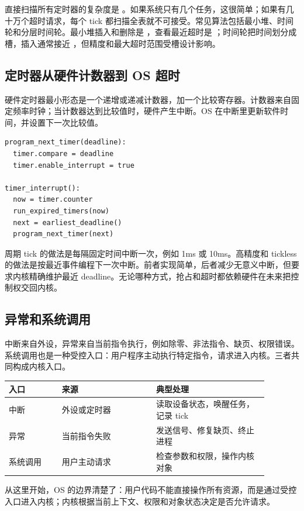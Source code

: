 直接扫描所有定时器的复杂度是 。如果系统只有几个任务，这很简单；如果有几十万个超时请求，每个 tick 都扫描全表就不可接受。常见算法包括最小堆、时间轮和分层时间轮。最小堆插入和删除是 ，查看最近超时是 ；时间轮把时间划分成槽，插入通常接近 ，但精度和最大超时范围受槽设计影响。

\subsection{定时器从硬件计数器到 OS 超时}

硬件定时器最小形态是一个递增或递减计数器，加一个比较寄存器。计数器来自固定频率时钟；当计数器达到比较值时，硬件产生中断。OS 在中断里更新软件时间，并设置下一次比较值。

\begin{lstlisting}
program_next_timer(deadline):
  timer.compare = deadline
  timer.enable_interrupt = true

timer_interrupt():
  now = timer.counter
  run_expired_timers(now)
  next = earliest_deadline()
  program_next_timer(next)
\end{lstlisting}

周期 tick 的做法是每隔固定时间中断一次，例如 1ms 或 10ms。高精度和 tickless 的做法是按最近事件编程下一次中断。前者实现简单，后者减少无意义中断，但要求内核精确维护最近 deadline。无论哪种方式，抢占和超时都依赖硬件在未来把控制权交回内核。

\subsection{异常和系统调用}

中断来自外设，异常来自当前指令执行，例如除零、非法指令、缺页、权限错误。系统调用也是一种受控入口：用户程序主动执行特定指令，请求进入内核。三者共同构成内核入口。

\begin{longtable}{p{0.18\linewidth}p{0.32\linewidth}p{0.38\linewidth}}
\toprule
入口 & 来源 & 典型处理 \\
\midrule
中断 & 外设或定时器 & 读取设备状态，唤醒任务，记录 tick \\
异常 & 当前指令失败 & 发送信号、修复缺页、终止进程 \\
系统调用 & 用户主动请求 & 检查参数和权限，操作内核对象 \\
\bottomrule
\end{longtable}

从这里开始，OS 的边界清楚了：用户代码不能直接操作所有资源，而是通过受控入口进入内核；内核根据当前上下文、权限和对象状态决定是否允许请求。

